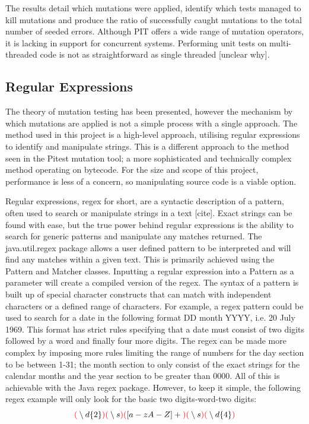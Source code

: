 \documentclass[a4paper,12pt]{article}
\begin{document}
The results detail which mutations were applied, identify which tests managed to kill mutations and produce the ratio of successfully caught mutations to the total number of seeded errors. Although PIT offers a wide range of mutation operators, it is lacking in support for concurrent systems. Performing unit tests on multi-threaded code is not as straightforward as single threaded [unclear why].


\subsection{Regular Expressions}    

The theory of mutation testing has been presented, however the mechanism by which mutations are applied is not a simple process with a single approach. The method used in this project is a high-level approach, utilising regular expressions to identify and manipulate strings. This is a different approach to the method seen in the Pitest mutation tool; a more sophisticated and technically complex method operating on bytecode. For the size and scope of this project, performance is less of a concern, so manipulating source code is a viable option. 

Regular expressions, regex for short, are a syntactic description of a pattern, often used to search or manipulate strings in a text [cite]. Exact strings can be found with ease, but the true power behind regular expressions is the ability to search for generic patterns and manipulate any matches returned. The java.util.regex package allows a user defined pattern to be interpreted and will find any matches within a given text. This is primarily achieved using the Pattern and Matcher classes. Inputting a regular expression into a Pattern as a parameter will create a compiled version of the regex. The syntax of a pattern is built up of special character constructs that can match with independent characters or a defined range of characters. For example, a regex pattern could be used to search for a date in the following format DD month YYYY, i.e. 20 July 1969. This format has strict rules specifying that a date must consist of two digits followed by a word and finally four more digits. The regex can be made more complex by imposing more rules limiting the range of numbers for the day section to be between 1-31; the month section to only consist of the exact strings for the calendar months and the year section to be greater than 0000. All of this is achievable with the Java regex package. However, to keep it simple, the following regex example will only look for the basic two digits-word-two digits:
\begin{equation}
    \textbf{$\color{red}($} \setminus d\{2\} \textbf{$\color{red})($} \setminus s \textbf{$\color{red})($} [a-zA-Z]+ \textbf{$\color{red})($} \setminus s \textbf{$\color{red})($} \setminus d\{4\} \textbf{$\color{red})$}
\end{equation}
\end{document}
